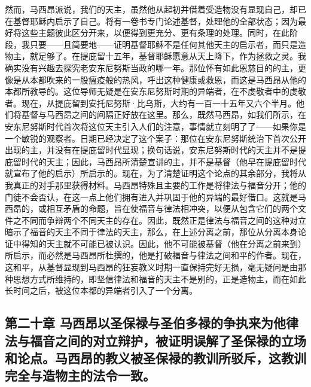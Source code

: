 然而，马西昂派说，我们的天主，虽然他从起初并借着受造物没有显现自己，却已在基督耶稣内启示了自己。将有一卷书专门论述基督，处理他的全部状态；因为最好将这些主题彼此区分开来，以便得到更充分、更有条理的处理。同时，在此阶段，我只要——且简要地——证明基督耶稣不是任何其他天主的启示者，而只是造物主，就足够了。在提庇留十五年，基督耶稣愿意从天上降下，作为拯救之灵。我确实没有兴趣去探究老安东尼努斯当政的哪一年。那位怀有如此恩慈目的的主，更像是从本都吹来的一股瘟疫般的热风，呼出这种健康或救恩，而这是马西昂从他的本都所教导的。这位导师无疑是在安东尼努斯时期的异端者，在不虔敬者中的虔敬者。现在，从提庇留到安托尼努斯·比乌斯，大约有一百一十五年又六个半月。他们将基督与马西昂之间的间隔正好放在这里。那么，既然马西昂，如我们所示，在安东尼努斯时代首次将这位天主引入人们的注意，事情就立刻明了了——如果你是一个敏锐的观察者。日期已经决定了这个案子：那位在安东尼努斯统治下首次公开出现的主，并没有在提庇留时代显现；换句话说，安东尼努斯时代的天主并不是提庇留时代的天主；因此，马西昂所清楚宣讲的主，并不是基督（他早在提庇留时代就宣布了他的启示）所启示的。现在，为了清楚证明这个论点的其余部分，我将从我真正的对手那里获得材料。马西昂特殊且主要的工作是将律法与福音分开；他的门徒不会否认，在这一点上他们拥有进入并巩固于他的异端的最好借口。这就是马西昂的，或相互矛盾的命题，旨在使福音与律法相冲突，以便从包含它们的两个文件之不同而争辩两个不同天主的存在。因此，既然正是律法与福音之间的这种对立暗示了福音的天主不同于律法的天主，那么，在上述分离之前，那位从分离本身论证中得知的天主就不可能已被认识。因此，他不可能被基督（他在分离之前来到）所启示，而必然是马西昂所杜撰的，他是打破福音与律法之间和平的作者。现在，这和平，从基督显现到马西昂的狂妄教义时期一直保持完好无损，毫无疑问是由那种思想方式所维持的，即坚信律法和福音的天主不是别的，正是造物主，而在如此长时间之后，被这位本都的异端者引入了一个分离。\par


\subsection{第二十章 马西昂以圣保禄与圣伯多禄的争执来为他律法与福音之间的对立辩护，被证明误解了圣保禄的立场和论点。马西昂的教义被圣保禄的教训所驳斥，这教训完全与造物主的法令一致。}

